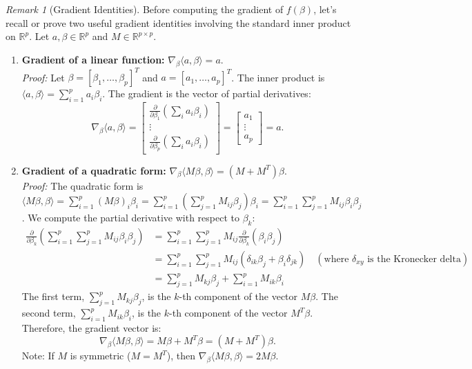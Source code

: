 \documentclass[11pt]{article}
\theoremstyle{definition}
\theoremstyle{remark}
\newtheorem{remark}[theorem]{Remark}
\newcommand{\R}{\mathbb{R}} %
\newcommand{\inner}[2]{\langle #1, #2 \rangle} %
\begin{document}
\begin{remark}[Gradient Identities] \label{rem:grad_identities}
Before computing the gradient of $f(\beta)$, let's recall or prove two useful gradient identities involving the standard inner product on $\R^p$. Let $a, \beta \in \R^p$ and $M \in \R^{p \times p}$.
\begin{enumerate}
    \item \textbf{Gradient of a linear function:} $\nabla_\beta \inner{a}{\beta} = a$. \\
    \textit{Proof:} Let $\beta = [\beta_1, \dots, \beta_p]^T$ and $a = [a_1, \dots, a_p]^T$. The inner product is $\inner{a}{\beta} = \sum_{i=1}^p a_i \beta_i$. The gradient is the vector of partial derivatives:
    \[
    \nabla_\beta \inner{a}{\beta} = \begin{bmatrix} \frac{\partial}{\partial \beta_1} (\sum_i a_i \beta_i) \\ \vdots \\ \frac{\partial}{\partial \beta_p} (\sum_i a_i \beta_i) \end{bmatrix} = \begin{bmatrix} a_1 \\ \vdots \\ a_p \end{bmatrix} = a.
    \]

    \item \textbf{Gradient of a quadratic form:} $\nabla_\beta \inner{M\beta}{\beta} = (M + M^T)\beta$. \\
    \textit{Proof:} The quadratic form is $\inner{M\beta}{\beta} = \sum_{i=1}^p (M\beta)_i \beta_i = \sum_{i=1}^p \left( \sum_{j=1}^p M_{ij} \beta_j \right) \beta_i = \sum_{i=1}^p \sum_{j=1}^p M_{ij} \beta_i \beta_j$.
    We compute the partial derivative with respect to $\beta_k$:
    \begin{align*} \frac{\partial}{\partial \beta_k} \left( \sum_{i=1}^p \sum_{j=1}^p M_{ij} \beta_i \beta_j \right) &= \sum_{i=1}^p \sum_{j=1}^p M_{ij} \frac{\partial}{\partial \beta_k} (\beta_i \beta_j) \\ &= \sum_{i=1}^p \sum_{j=1}^p M_{ij} (\delta_{ik} \beta_j + \beta_i \delta_{jk}) \quad (\text{where } \delta_{xy} \text{ is the Kronecker delta}) \\ &= \sum_{j=1}^p M_{kj} \beta_j + \sum_{i=1}^p M_{ik} \beta_i \end{align*}
    The first term, $\sum_{j=1}^p M_{kj} \beta_j$, is the $k$-th component of the vector $M\beta$.
    The second term, $\sum_{i=1}^p M_{ik} \beta_i$, is the $k$-th component of the vector $M^T\beta$.
    Therefore, the gradient vector is:
    \[
    \nabla_\beta \inner{M\beta}{\beta} = M\beta + M^T\beta = (M + M^T)\beta.
    \]
    Note: If $M$ is symmetric ($M = M^T$), then $\nabla_\beta \inner{M\beta}{\beta} = 2M\beta$.
\end{enumerate}
\end{remark}
\end{document}
